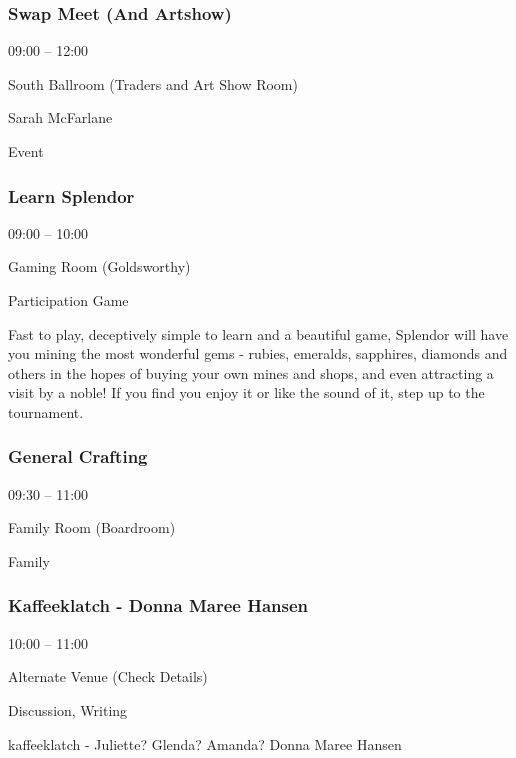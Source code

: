 \documentclass{scrreprt}
\begin{document}
\begin{multicols}{2}
\subsubsection*{Swap Meet (And Artshow)}\begin{description}
\setlength{\itemsep}{0pt}
\setlength{\parsep}{0pt}
\setlength{\parskip}{0pt}
\item[Time:]{09:00 -- 12:00}
\item[Venue:]{South Ballroom (Traders and Art Show Room)}
\item[People:]{Sarah McFarlane}
\item[Tags:]{Event}\end{description}

\subsubsection*{Learn Splendor}\begin{description}
\setlength{\itemsep}{0pt}
\setlength{\parsep}{0pt}
\setlength{\parskip}{0pt}
\item[Time:]{09:00 -- 10:00}
\item[Venue:]{Gaming Room (Goldsworthy)}
\item[Tags:]{Participation Game}\end{description}
Fast to play, deceptively simple to learn and a beautiful game, Splendor will have you mining the most wonderful gems - rubies, emeralds, sapphires, diamonds and others in the hopes of buying your own mines and shops, and even attracting a visit by a noble! If you find you enjoy it or like the sound of it, step up to the tournament.
\subsubsection*{General Crafting}\begin{description}
\setlength{\itemsep}{0pt}
\setlength{\parsep}{0pt}
\setlength{\parskip}{0pt}
\item[Time:]{09:30 -- 11:00}
\item[Venue:]{Family Room (Boardroom)}
\item[Tags:]{Family}\end{description}

\subsubsection*{Kaffeeklatch - Donna Maree Hansen}\begin{description}
\setlength{\itemsep}{0pt}
\setlength{\parsep}{0pt}
\setlength{\parskip}{0pt}
\item[Time:]{10:00 -- 11:00}
\item[Venue:]{Alternate Venue (Check Details)}
\item[Tags:]{Discussion, Writing}\end{description}
kaffeeklatch - Juliette? Glenda? Amanda? Donna Maree Hansen

\end{multicols}
\end{document}

